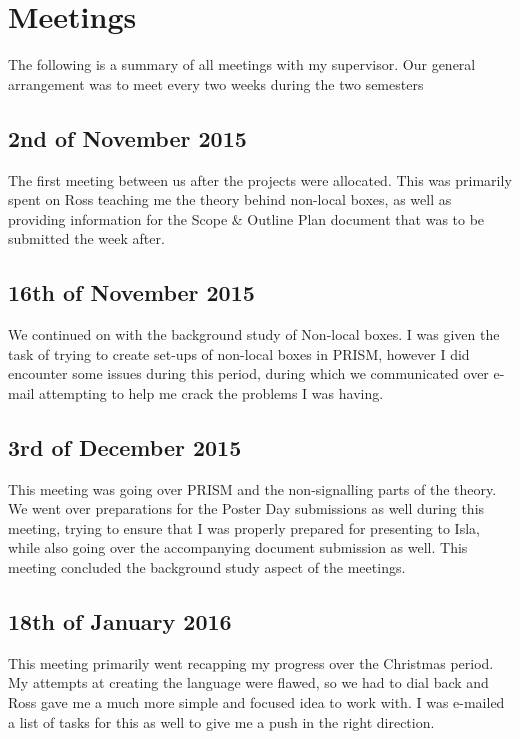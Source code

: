 \documentclass[report.tex]{subfiles}
\begin{document}
\section{Meetings} %
\label{sec:meetings}
The following is a summary of all meetings with my supervisor. Our general
arrangement was to meet every two weeks during the two semesters

\subsection{2nd of November 2015} %
\label{sub:2nd_of_february_2015}
The first meeting between us after the projects were allocated. This was
primarily spent on Ross teaching me the theory behind non-local boxes, as well
as providing information for the Scope \& Outline Plan document that was to be
submitted the week after.

\subsection{16th of November 2015} %
\label{sub:16th_of_november_2015}
We continued on with the background study of Non-local boxes. I was given the
task of trying to create set-ups of non-local boxes in PRISM, however I did
encounter some issues during this period, during which we communicated over
e-mail attempting to help me crack the problems I was having.

\subsection{3rd of December 2015} %
\label{sub:3rd_of_december_2015}
This meeting was going over PRISM and the non-signalling parts of the theory. 
We went over preparations for the Poster Day submissions as well during this
meeting, trying to ensure that I was properly prepared for presenting to Isla,
while also going over the accompanying document submission as well. This
meeting concluded the background study aspect of the meetings.

\subsection{18th of January 2016} %
This meeting primarily went recapping my progress over the Christmas period. My
attempts at creating the language were flawed, so we had to dial back and Ross
gave me a much more simple and focused idea to work with. I was e-mailed a list
of tasks for this as well to give me a push in the right direction.
\label{sub:18th_of_january_2016}

\end{document}
